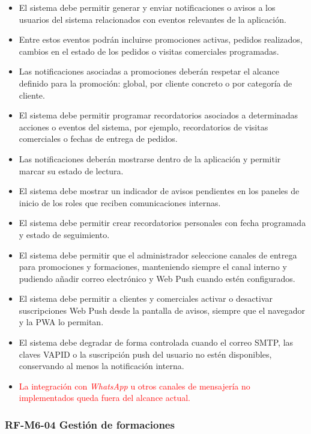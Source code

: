 \begin{itemize}
    \item El sistema debe permitir generar y enviar notificaciones o avisos a los usuarios del sistema relacionados con eventos relevantes de la aplicación.
    \item Entre estos eventos podrán incluirse promociones activas, pedidos realizados, cambios en el estado de los pedidos o visitas comerciales programadas.
    \item Las notificaciones asociadas a promociones deberán respetar el alcance definido para la promoción: global, por cliente concreto o por categoría de cliente.
    \item El sistema debe permitir programar recordatorios asociados a determinadas acciones o eventos del sistema, por ejemplo, recordatorios de visitas comerciales o fechas de entrega de pedidos.
    \item Las notificaciones deberán mostrarse dentro de la aplicación y permitir marcar su estado de lectura.
    \item El sistema debe mostrar un indicador de avisos pendientes en los paneles de inicio de los roles que reciben comunicaciones internas.
    \item El sistema debe permitir crear recordatorios personales con fecha programada y estado de seguimiento.
    \item El sistema debe permitir que el administrador seleccione canales de entrega para promociones y formaciones, manteniendo siempre el canal interno y pudiendo añadir correo electrónico y Web Push cuando estén configurados.
    \item El sistema debe permitir a clientes y comerciales activar o desactivar suscripciones Web Push desde la pantalla de avisos, siempre que el navegador y la PWA lo permitan.
    \item El sistema debe degradar de forma controlada cuando el correo SMTP, las claves VAPID o la suscripción push del usuario no estén disponibles, conservando al menos la notificación interna.
    \item \textcolor{red}{La integración con \textit{WhatsApp} u otros canales de mensajería no implementados queda fuera del alcance actual.}
\end{itemize}

\vspace{-0.75em}
\subsubsection{RF-M6-04 Gestión de formaciones}
\vspace{-1em}

